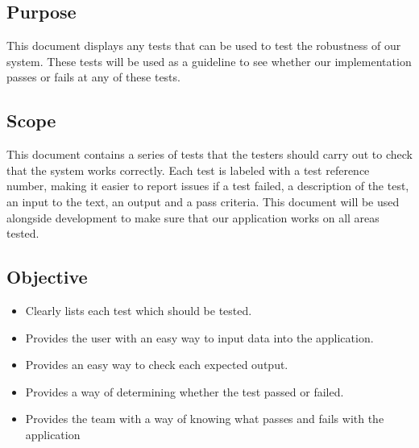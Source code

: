 \documentclass[12pt, portrait]{article}
\begin{document}
\subsection{Purpose}
This document displays any tests that can be used to test the robustness of our system. These tests will be used as a guideline to see whether our implementation passes or fails at any of these tests. 
\subsection{Scope}
This document contains a series of tests that the testers should carry out to check that the system works correctly. Each test is labeled with a test reference number, making it easier to report issues if a test failed, a description of the test, an input to the text, an output and a pass criteria. This document will be used alongside development to make sure that our application works on all areas tested. 
\subsection{Objective}
\begin{itemize}
\item Clearly lists each test which should be tested.
\item Provides the user with an easy way to input data into the application.
\item Provides an easy way to check each expected output.
\item Provides a way of determining whether the test passed or failed.
\item Provides the team with a way of knowing what passes and fails with the application
\end{itemize}
\newpage
\end{document}
